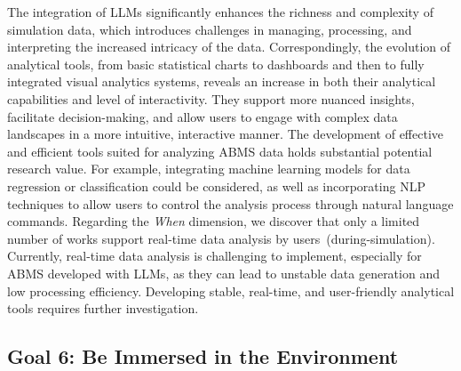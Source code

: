 The integration of LLMs significantly enhances the richness and complexity of simulation data, which introduces challenges in managing, processing, and interpreting the increased intricacy of the data.
Correspondingly, the evolution of analytical tools, from basic statistical charts to dashboards and then to fully integrated visual analytics systems, reveals an increase in both their analytical capabilities and level of interactivity.
They support more nuanced insights, facilitate decision-making, and allow users to engage with complex data landscapes in a more intuitive, interactive manner.
The development of effective and efficient tools suited for analyzing ABMS data holds substantial potential research value.
For example, integrating machine learning models for data regression or classification could be considered, as well as incorporating NLP techniques to allow users to control the analysis process through natural language commands.
Regarding the \textit{When} dimension, we discover that only a limited number of works support real-time data analysis by users~(during-simulation).
Currently, real-time data analysis is challenging to implement, especially for ABMS developed with LLMs, as they can lead to unstable data generation and low processing efficiency.
Developing stable, real-time, and user-friendly analytical tools requires further investigation.



\subsection{Goal 6: Be Immersed in the Environment}\label{immersed}

